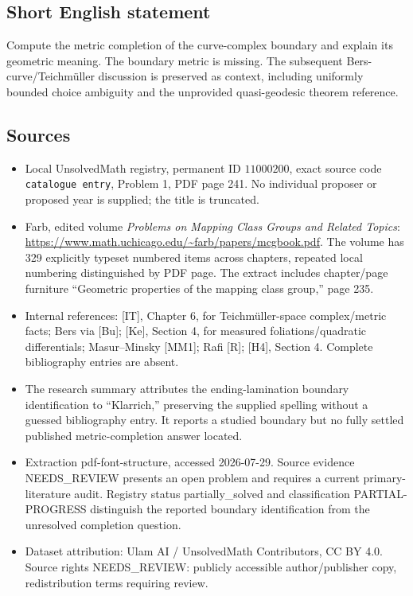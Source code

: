 \documentclass[11pt]{article}
\begin{document}
\subsection{Short English statement}
Compute the metric completion of the curve-complex boundary and explain its geometric meaning. The boundary metric is missing. The subsequent Bers-curve/Teichmüller discussion is preserved as context, including uniformly bounded choice ambiguity and the unprovided quasi-geodesic theorem reference.
\subsection{Sources}
\begin{itemize}
\item Local UnsolvedMath registry, permanent ID \(11000200\), exact source code \texttt{catalogue entry}, Problem 1, PDF page 241. No individual proposer or proposed year is supplied; the title is truncated.
\item Farb, edited volume \emph{Problems on Mapping Class Groups and Related Topics}: \url{https://www.math.uchicago.edu/~farb/papers/mcgbook.pdf}. The volume has 329 explicitly typeset numbered items across chapters, repeated local numbering distinguished by PDF page. The extract includes chapter/page furniture ``Geometric properties of the mapping class group,'' page 235.
\item Internal references: [IT], Chapter 6, for Teichmüller-space complex/metric facts; Bers via [Bu]; [Ke], Section 4, for measured foliations/quadratic differentials; Masur--Minsky [MM1]; Rafi [R]; [H4], Section 4. Complete bibliography entries are absent.
\item The research summary attributes the ending-lamination boundary identification to ``Klarrich,'' preserving the supplied spelling without a guessed bibliography entry. It reports a studied boundary but no fully settled published metric-completion answer located.
\item Extraction pdf-font-structure, accessed 2026-07-29. Source evidence NEEDS\_REVIEW presents an open problem and requires a current primary-literature audit. Registry status partially\_solved and classification PARTIAL-PROGRESS distinguish the reported boundary identification from the unresolved completion question.
\item Dataset attribution: Ulam AI / UnsolvedMath Contributors, CC BY 4.0. Source rights NEEDS\_REVIEW: publicly accessible author/publisher copy, redistribution terms requiring review.
\end{itemize}
\end{document}
